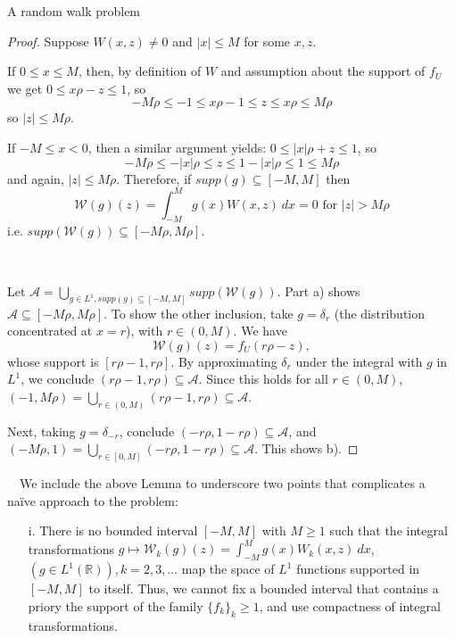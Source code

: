 \documentclass[12pt]{article}
\begin{document}
\begin{section}{A random walk problem}
\begin{proof} Suppose $W(x,z) \ne 0$ and $|x| \le M$ for some $x, z$.  
	
	If $0 \le x \le M$, then, by definition of $W$ and assumption about the support of $f_U$ we get $0 \le x \rho - z \le 1$, so 
\begin{equation*}
-M \rho \le -1 \le x \rho - 1 \le z \le x \rho \le M \rho
\end{equation*}
so $|z| \le M \rho$. 

If  $ - M \le x < 0$, then a similar argument yields: $0 \le |x| \rho + z \le 1$, so 
\begin{equation*}
-M \rho \le - |x| \rho  \le z \le 1 - |x| \rho \le 1 \le M \rho
\end{equation*}
and again, $|z| \le M \rho$. Therefore, if $supp(g) \subseteq [-M,M]$ then 
$$
\mathcal{W}(g)(z) = \int_{-M}^{M} g(x) W(x,z) \ dx = 0 \text{ for $|z| > M \rho$}
$$ i.e. $supp(\mathcal{W}(g)) \subseteq [-M \rho, M \rho]$.  

\  

Let $ \mathcal{A} = \bigcup_{g \in L^1 , supp(g) \subseteq [-M,M]} supp(\mathcal{W}(g)) $. Part a) shows $\mathcal{A}  \subseteq [-M \rho,M \rho] $. To show the other inclusion, take $g = \delta_r$ (the distribution concentrated at $x=r$), with $r \in (0,M)$. We have 
$$
\mathcal{W}(g)(z) = f_U(r \rho -z) ,
$$
whose support is $[r \rho-1,r \rho]$. By approximating $\delta_r$ under the integral with $g$ in $L^1$, we conclude $(r \rho-1,r \rho) \subseteq \mathcal{A}$. Since this holds for all $r \in (0,M)$, $(-1,M \rho) = \bigcup_{r \in (0,M)} (r \rho-1,r \rho) \subseteq \mathcal{A}$.  

 Next, taking $g=\delta_{-r}$, conclude $(- r \rho, 1 - r \rho) \subseteq \mathcal{A}$, and $(-M \rho,1) =  \bigcup_{r \in [0,M]} (-r \rho, 1 -r \rho) \subseteq \mathcal{A}$. This shows b).
\end{proof}

\ 
\ 
We include the above Lemma to underscore two points that complicates a na\"ive approach to the problem:
\begin{itemize}
\item[i.] There is no bounded interval $[-M,M]$ with $M\ge1$ such that the integral transformations $ g \mapsto \mathcal{W}_k(g)(z) = \int_{-M}^{M} g(x) W_k(x,z) \ dx$,  $( g \in L^1(\mathbb{R})), k = 2, 3, \dots $ map the space of $L^1$ functions supported in $[-M,M]$ to itself. Thus, we cannot fix a bounded interval that contains a priory the support of the family $\{f_k\}_k \ge 1$, and use compactness of integral transformations.  


\end{itemize}
\end{section}
\end{document}
